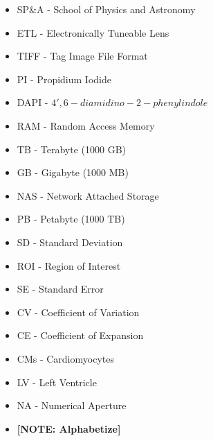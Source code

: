 \begin{itemize}
  \item SP\&A - School of Physics and Astronomy
  \item ETL - Electronically Tuneable Lens
  \item TIFF - Tag Image File Format
  \item PI - Propidium Iodide
  \item DAPI - $4',6-diamidino-2-phenylindole$
  \item RAM - Random Access Memory
  \item TB - Terabyte (1000 GB)
  \item GB - Gigabyte (1000 MB)
  \item NAS - Network Attached Storage
  \item PB - Petabyte (1000 TB)
  \item SD - Standard Deviation
  \item ROI - Region of Interest
  \item SE - Standard Error
  \item CV - Coefficient of Variation
  \item CE - Coefficient of Expansion
  \item CMs - Cardiomyocytes
  \item LV - Left Ventricle
  \item NA - Numerical Aperture
  \item \textbf{[NOTE: Alphabetize]}
\end{itemize}